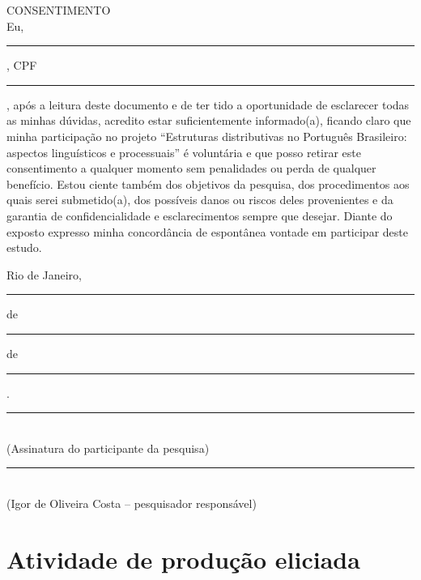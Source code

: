 \noindent CONSENTIMENTO \\
Eu, \rule[-1mm]{8cm}{0.3mm}, CPF \rule[-1mm]{5cm}{0.3mm}, após a leitura deste documento e de ter tido a oportunidade de esclarecer todas as minhas dúvidas, acredito estar suficientemente informado(a), ficando claro que minha participação no projeto ``Estruturas distributivas no Português Brasileiro: aspectos linguísticos e processuais'' é voluntária e que posso retirar este consentimento a qualquer momento sem penalidades ou perda de qualquer benefício. Estou ciente também dos objetivos da pesquisa, dos procedimentos aos quais serei submetido(a), dos possíveis danos ou riscos deles provenientes e da garantia de confidencialidade e esclarecimentos sempre que desejar.
Diante do exposto expresso minha concordância de espontânea vontade em participar deste estudo.

\begin{center}
  Rio de Janeiro, \rule[-1mm]{1cm}{0.3mm} de \rule[-1mm]{3cm}{0.3mm} de \rule[-1mm]{1.5cm}{0.3mm}.\\
  \vspace{1cm}
  \rule[-1mm]{8cm}{0.3mm}\\
  (Assinatura do participante da pesquisa)\\
  \vspace{1cm}
  \rule[-1mm]{8cm}{0.3mm}\\
  (Igor de Oliveira Costa -- pesquisador responsável)
\end{center}
\vspace{2cm}

\section{Atividade de produção eliciada}

